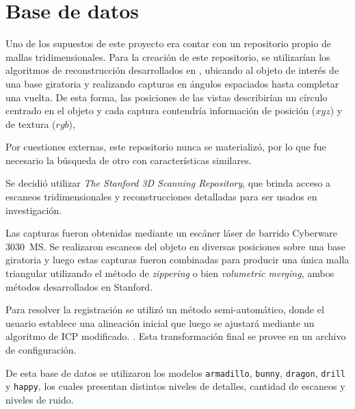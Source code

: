 \section{Base de datos}
Uno de los supuestos de este proyecto era contar con un repositorio propio de
mallas tridimensionales.
Para la creación de este repositorio,
se utilizarían los algoritmos de reconstrucción desarrollados en ,
ubicando al objeto de interés de una base giratoria y realizando capturas
en ángulos espaciados hasta completar una vuelta.
De esta forma, las posiciones de las vistas describirían un círculo centrado en el objeto y
cada captura contendría información de posición ($xyz$) y de textura ($rgb$),

Por cuestiones externas, este repositorio nunca se materializó, por lo que fue necesario
la búsqueda de otro con características similares.


Se decidió utilizar \emph{The Stanford 3D Scanning Repository}, que brinda
acceso a escaneos tridimensionales y reconstrucciones detalladas para ser
usados en investigación.

Las capturas fueron obtenidas mediante un escáner láser de barrido Cyberware
3030~MS.  Se realizaron escaneos del objeto en diversas posiciones sobre una
base giratoria y luego estas capturas fueron combinadas para producir una única
malla triangular utilizando el método de \emph{zippering} o bien
\emph{volumetric merging}, ambos métodos desarrollados en
Stanford.

Para resolver la registración se utilizó un método semi-automático,
donde el usuario establece una alineación inicial que luego se ajustará mediante un algoritmo
de ICP modificado.  .
Esta transformación final se provee en un archivo de configuración.

De esta base de datos se utilizaron los modelos
	\texttt{armadillo},
	\texttt{bunny},
	\texttt{dragon},
	\texttt{drill} y
	\texttt{happy},
los cuales presentan distintos niveles de detalles, cantidad de escaneos y niveles de ruido.


